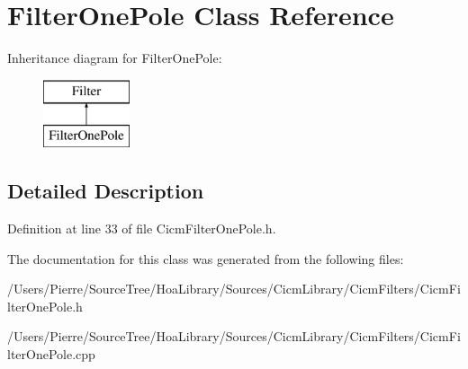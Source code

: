 \hypertarget{class_filter_one_pole}{\section{Filter\-One\-Pole Class Reference}
\label{class_filter_one_pole}
}
Inheritance diagram for Filter\-One\-Pole\-:\begin{figure}[H]
\begin{center}
\leavevmode
\includegraphics[height=2.000000cm]{class_filter_one_pole}
\end{center}
\end{figure}


\subsection{Detailed Description}


Definition at line 33 of file Cicm\-Filter\-One\-Pole.\-h.



The documentation for this class was generated from the following files\-:\begin{DoxyCompactItemize}
\item 
/\-Users/\-Pierre/\-Source\-Tree/\-Hoa\-Library/\-Sources/\-Cicm\-Library/\-Cicm\-Filters/Cicm\-Filter\-One\-Pole.\-h\item 
/\-Users/\-Pierre/\-Source\-Tree/\-Hoa\-Library/\-Sources/\-Cicm\-Library/\-Cicm\-Filters/Cicm\-Filter\-One\-Pole.\-cpp\end{DoxyCompactItemize}
